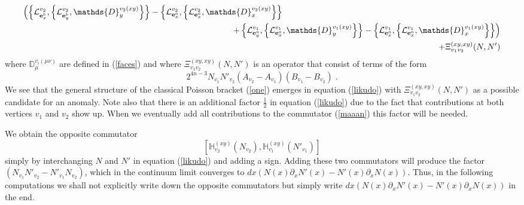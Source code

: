 \documentclass[12pt]{article}
\newcommand{\nn}{\nonumber}
\def\m{\mu}
\def\n{\nu}
\def\cl{{\cal L}}
\newcommand{\pa}{\partial}
\begin{document}
\begin{appendix}
\begin{eqnarray}
\left(
\left\{ \cl^{v_2}_{{\bf e}^b_x}  , \left\{  \cl^{v_2}_{{\bf e}^b_y} ,  \mathds{D}^{v_2(xy) }_{y}    \right\} \right\}
-
\left\{ \cl^{v_2}_{{\bf e}^a_x}   
 , \left\{ \cl^{v_2}_{{\bf e}^a_x}  ,  \mathds{D}^{v_2(xy)}_{x}   \right\} \right\}
\right.
\nn\\
&&\hspace{-2.5cm}
\left.
+\left\{ \cl^{v_1}_{{\bf e}^a_y} ,  \left\{ \cl^{v_1}_{{\bf e}^a_x}  ,  \mathds{D}^{v_1(xy) }_{y} 
\right\}\right\} 
-
 \left\{ \cl^{v_1}_{{\bf e}^a_x}  , \left\{ \cl^{v_1}_{{\bf e}^a_x}  ,\mathds{D}^{v_1(xy) }_{x} 
\right\}\right\} 
\right)
\nn\\
&&\hspace{-2.5cm}
+ \Xi^{(xy,xy)}_{v_1v_2}(N,N')
\label{likudo}
\end{eqnarray}
%
%
%
%
%
%
%
%
where $\mathds{D}^{v_i(\m\n) }_{\m}$ are defined in (\ref{faces}) and where $\Xi^{(xy,xy)}_{v_1v_2}(N,N')$ is an operator that consist of terms of the form
\begin{equation}
2^{4n-3} N_{v_1}N'_{v_2} (A_{v_2}- A_{v_1}) (B_{v_1}-B_{v_2})\;.
\label{likud}
\end{equation}
We see that the general structure of the classical Poisson bracket (\ref{one}) emerges in equation (\ref{likudo}) with $\Xi^{(xy,xy)}_{v_1v_2}(N,N')$ as a possible candidate for an anomaly. 
Note also that there is an additional factor $\tfrac{1}{2}$ in equation (\ref{likudo}) due to the fact that contributions at both vertices $v_1$ and $v_2$ show up. When we eventually add all contributions to the commutator (\ref{maaan}) this factor will be needed.



We obtain the opposite commutator
$$
\left[\mathds{H}^{(xy)}_{v_2}(N_{v_2}),\mathds{H}^{(xy)}_{v_1}(N'_{v_1})\right] 
$$
simply by interchanging $N$ and $N'$ in equation (\ref{likudo}) and adding a sign. Adding these two commutators will produce the factor $\left(N_{v_1}N'_{v_2} -N'_{v_1}N_{v_2}   \right)$, which in the continuum limit converges to $dx(N(x)\pa_x N'(x) - N'(x)\pa_x N(x)) $. Thus, in the following computations we shall not explicitly write down the opposite commutators but simply write $dx(N(x)\pa_x N'(x) - N'(x)\pa_x N(x) )$ in the end.
























\end{appendix}
\end{document}
